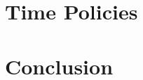 \chapter{Time Policies}\label{time}





\chapter{Conclusion}\label{conclusion}


\printbibliography[heading=bibintoc]
\label{bib:mybiblio}



